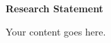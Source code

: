 \documentclass{hustletter}
\begin{document}
\setlength{\parindent}{2\ccwd}

\vspace*{0.5cm}
{\centering{}\bfseries\sffamily Research Statement\par}
\vspace{1cm}

Your content goes here.
\end{document}
